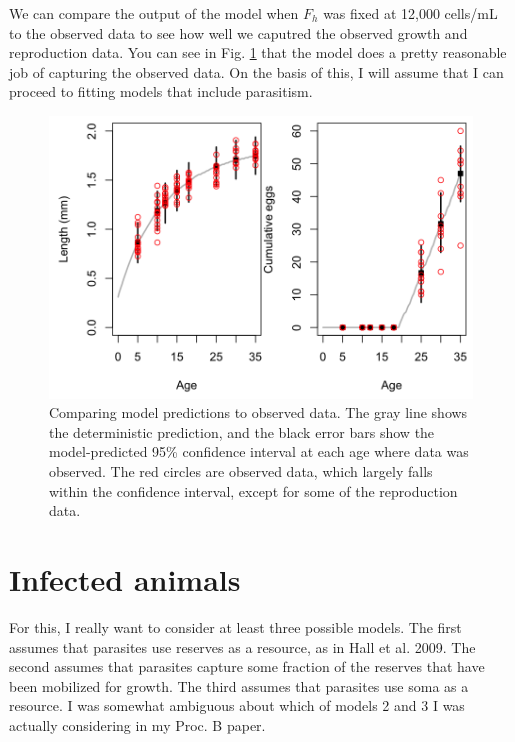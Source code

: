 \documentclass[12pt,reqno,final,pdftex]{amsart}\usepackage[]{graphicx}\usepackage[]{color}
\newenvironment{knitrout}{}{} %
\theoremstyle{plain}
\numberwithin{equation}{part}
\begin{document}
We can compare the output of the model when $F_h$ was fixed at 12,000 cells/mL to the observed data to see how well we caputred the observed growth and reproduction data.
You can see in Fig. \ref{fig:model-data-comp} that the model does a pretty reasonable job of capturing the observed data.
On the basis of this, I will assume that I can proceed to fitting models that include parasitism.

\begin{knitrout}\scriptsize
{}\color{fgcolor}\begin{figure}

\includegraphics[width=\linewidth]{figure/model-data-comp-1} \hfill{}

\caption[Comparing model predictions to observed data]{Comparing model predictions to observed data. The gray line shows the deterministic prediction, and the black error bars show the model-predicted 95\% confidence interval at each age where data was observed. The red circles are observed data, which largely falls within the confidence interval, except for some of the reproduction data.}\label{fig:model-data-comp}
\end{figure}


\end{knitrout}

\section*{Infected animals}
For this, I really want to consider at least three possible models.
The first assumes that parasites use reserves as a resource, as in Hall et al. 2009.
The second assumes that parasites capture some fraction of the reserves that have been mobilized for growth.
The third assumes that parasites use soma as a resource.
I was somewhat ambiguous about which of models 2 and 3 I was actually considering in my Proc. B paper.
\end{document}
